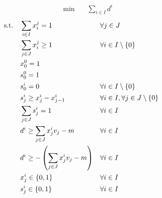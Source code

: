 \begin{align}
    \min\quad       & \sum_{i \in I} d^i
    \label{eq:somma-obj}
\end{align}
\vspace*{-6mm}
\begin{align}
    \text{s.t.\quad}
    \label{eq:somma-c1}
    & \sum_{i \in I}{x_i^j = 1}                             &   & \forall j \in J                                  \\
    \label{eq:somma-c2}
    & \sum_{j \in J}{x_i^j} \geq 1                          &   & \forall i \in I \setminus \{0\}                  \\
    \label{eq:somma-c3}
    & x^0_0 = 1                                             &   &                                                  \\
    \label{eq:somma-c4}
    & s^0_0 = 1                                             &   &                                                  \\
    \label{eq:somma-c5}
    & s^i_0 = 0                                             &   & \forall i \in I \setminus \{0\}                  \\
    \label{eq:somma-c6}
    & s^i_j \geq x^i_j - x^i_{j-1}                          &   & \forall i \in I, \forall j \in J \setminus \{0\} \\
    \label{eq:somma-c7}
    & \sum_{j \in J}{s^i_j} = 1                             &   & \forall i \in I                                  \\
    \label{eq:somma-c8}
    & d^i \geq \sum_{j \in J}{x^i_jv_j} - m                 &   & \forall i \in I                                  \\
    \label{eq:somma-c9}
    & d^i \geq -\left(\sum_{j \in J}{x^i_jv_j} - m\right)   &   & \forall i \in I                                  \\
    \label{eq:somma-c10}
    & x^i_j \in \{0, 1\}   &   & \forall i \in I            &   &                                                  \\
    \label{eq:somma-c11}
    & s^i_j \in \{0, 1\}   &   & \forall i \in I
\end{align}